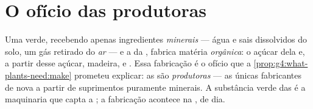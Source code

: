 \section{O ofício das produtoras}

\begin{proposition}\label{prop:g6:plants-are-producers:produce}
Uma  verde, recebendo apenas ingredientes \emph{minerais} ---
água e sais dissolvidos do solo, um gás retirado do \emph{ar} --- e a
 da \emph{}, fabrica matéria \emph{orgânica}: o açúcar dela
e, a partir desse açúcar, madeira,  e . Essa fabricação é o
ofício que a \cref{prop:g4:what-plants-need:make} prometeu explicar:
as  são \emph{produtoras} --- as únicas
fabricantes de  nova a partir de suprimentos
puramente minerais. A substância verde das  é a maquinaria que
capta a ; a fabricação acontece na , de dia.
\end{proposition}
\admitted

